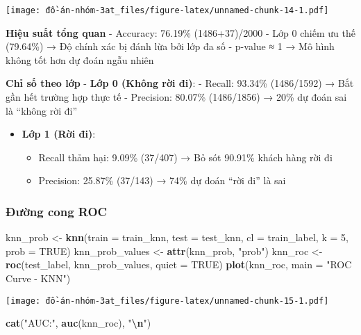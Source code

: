 \documentclass[
]{article}
\newenvironment{Shaded}{\begin{snugshade}}{\end{snugshade}}
\newcommand{\AttributeTok}[1]{\textcolor[rgb]{0.13,0.29,0.53}{#1}}
\newcommand{\ConstantTok}[1]{\textcolor[rgb]{0.56,0.35,0.01}{#1}}
\newcommand{\DecValTok}[1]{\textcolor[rgb]{0.00,0.00,0.81}{#1}}
\newcommand{\FunctionTok}[1]{\textcolor[rgb]{0.13,0.29,0.53}{\textbf{#1}}}
\newcommand{\NormalTok}[1]{#1}
\newcommand{\OtherTok}[1]{\textcolor[rgb]{0.56,0.35,0.01}{#1}}
\newcommand{\SpecialCharTok}[1]{\textcolor[rgb]{0.81,0.36,0.00}{\textbf{#1}}}
\newcommand{\StringTok}[1]{\textcolor[rgb]{0.31,0.60,0.02}{#1}}
\providecommand{\tightlist}{%
  \setlength{\itemsep}{0pt}\setlength{\parskip}{0pt}}
\begin{document}
\texttt{[image: đồ-án-nhóm-3at\_files/figure-latex/unnamed-chunk-14-1.pdf]}

\textbf{Hiệu suất tổng quan} - Accuracy: 76.19\% (1486+37)/2000 - Lớp 0
chiếm ưu thế (79.64\%) → Độ chính xác bị đánh lừa bởi lớp đa số -
p-value ≈ 1 → Mô hình không tốt hơn dự đoán ngẫu nhiên

\textbf{Chỉ số theo lớp} - \textbf{Lớp 0 (Không rời đi)}: - Recall:
93.34\% (1486/1592) → Bắt gần hết trường hợp thực tế - Precision:
80.07\% (1486/1856) → 20\% dự đoán sai là ``không rời đi''

\begin{itemize}
\tightlist
\item
  \textbf{Lớp 1 (Rời đi)}:

  \begin{itemize}
  \tightlist
  \item
    Recall thảm hại: 9.09\% (37/407) → Bỏ sót 90.91\% khách hàng rời đi
  \item
    Precision: 25.87\% (37/143) → 74\% dự đoán ``rời đi'' là sai
  \end{itemize}
\end{itemize}

\subsubsection{Đường cong ROC}\label{sec-knn-roc}

\begin{Shaded}
\begin{Highlighting}[]
\NormalTok{knn\_prob }\OtherTok{\textless{}{-}} \FunctionTok{knn}\NormalTok{(}\AttributeTok{train =}\NormalTok{ train\_knn, }\AttributeTok{test =}\NormalTok{ test\_knn, }\AttributeTok{cl =}\NormalTok{ train\_label, }\AttributeTok{k =} \DecValTok{5}\NormalTok{, }\AttributeTok{prob =} \ConstantTok{TRUE}\NormalTok{)}
\NormalTok{knn\_prob\_values }\OtherTok{\textless{}{-}} \FunctionTok{attr}\NormalTok{(knn\_prob, }\StringTok{"prob"}\NormalTok{)}
\NormalTok{knn\_roc }\OtherTok{\textless{}{-}} \FunctionTok{roc}\NormalTok{(test\_label, knn\_prob\_values, }\AttributeTok{quiet =} \ConstantTok{TRUE}\NormalTok{)}
\FunctionTok{plot}\NormalTok{(knn\_roc, }\AttributeTok{main =} \StringTok{"ROC Curve {-} KNN"}\NormalTok{)}
\end{Highlighting}
\end{Shaded}

\texttt{[image: đồ-án-nhóm-3at\_files/figure-latex/unnamed-chunk-15-1.pdf]}

\begin{Shaded}
\begin{Highlighting}[]
\FunctionTok{cat}\NormalTok{(}\StringTok{"AUC:"}\NormalTok{, }\FunctionTok{auc}\NormalTok{(knn\_roc), }\StringTok{"}\SpecialCharTok{\textbackslash{}n}\StringTok{"}\NormalTok{)}
\end{Highlighting}
\end{Shaded}
\end{document}
